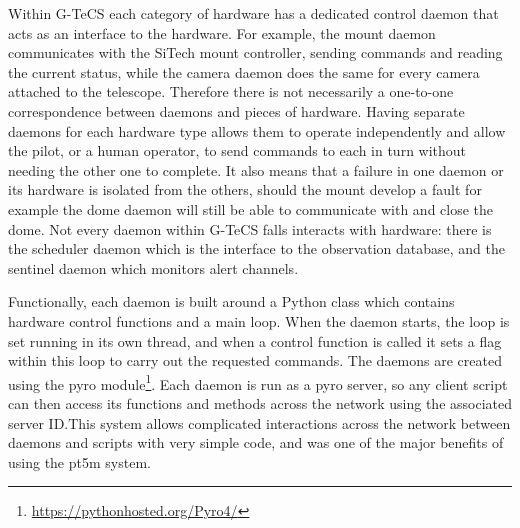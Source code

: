 \begin{colsection}
\begin{colsection}
Within G-TeCS each category of hardware has a dedicated control daemon that acts as an interface to the hardware. For example, the mount daemon communicates with the SiTech mount controller, sending commands and reading the current status, while the camera daemon does the same for every camera attached to the telescope. Therefore there is not necessarily a one-to-one correspondence between daemons and pieces of hardware. Having separate daemons for each hardware type allows them to operate independently and allow the pilot, or a human operator, to send commands to each in turn without needing the other one to complete. It also means that a failure in one daemon or its hardware is isolated from the others, should the mount develop a fault for example the dome daemon will still be able to communicate with and close the dome. Not every daemon within G-TeCS falls interacts with hardware: there is the scheduler daemon which is the interface to the observation database, and the sentinel daemon which monitors alert channels.

Functionally, each daemon is built around a Python class which contains hardware control functions and a main loop. When the daemon starts, the loop is set running in its own thread, and when a control function is called it sets a flag within this loop to carry out the requested commands. The daemons are created using the \gls{pyro} module\footnote{\url{https://pythonhosted.org/Pyro4/}}. Each daemon is run as a \gls{pyro} server, so any client script can then access its functions and methods across the network using the associated server ID.\@ This system allows complicated interactions across the network between daemons and scripts with very simple code, and was one of the major benefits of using the \gls{pt5m} system.

\end{colsection}


\end{colsection}


\newpage
